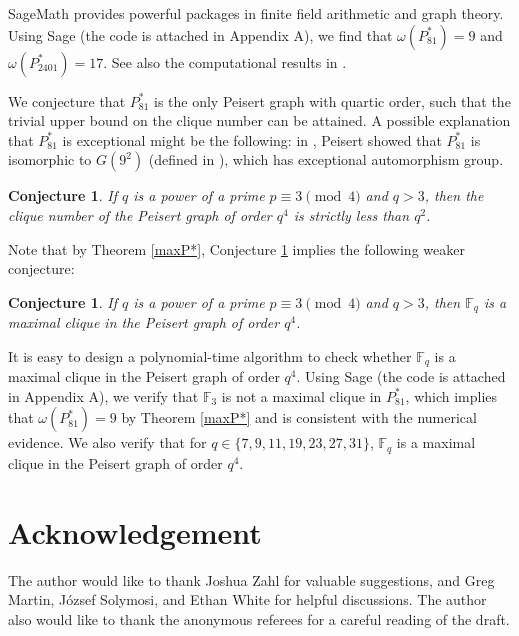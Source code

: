 \documentclass[12pt,oneside]{amsart}
\newtheorem{conj}[thm]{Conjecture}
\newcommand{\F}{\mathbb{F}}
\begin{document}
SageMath \cite{Sage} provides powerful packages in finite field arithmetic and graph theory. Using Sage (the code is attached in Appendix A), we find that $\omega(P_{81}^*)=9$ and $\omega(P_{2401}^*)=17$. See also the computational results in \cite[Section 3.4]{NM}. 

We conjecture that $P_{81}^*$ is the only Peisert graph with quartic order, such that the trivial upper bound on the clique number can be attained. A possible explanation that $P_{81}^*$ is exceptional might be the following: in \cite[Lemma 6.7]{WP2}, Peisert showed that $P_{81}^*$ is isomorphic to $G(9^2)$ (defined in \cite[Section 3]{WP2}), which has exceptional automorphism group.

\begin{conj}\label{conjclique}
If $q$ is a power of a prime $p \equiv 3 \pmod 4$  and $q>3$, then the clique number of the Peisert graph of order $q^4$ is strictly less than $q^2$.
\end{conj}

Note that by Theorem \ref{maxP*}, Conjecture \ref{conjclique} implies the following weaker conjecture:


\begin{conj}\label{conjmaxc}
If $q$ is a power of a prime $p \equiv 3 \pmod 4$  and $q>3$, then $\F_{q}$ is a maximal clique in the Peisert graph of order $q^4$.
\end{conj}

It is easy to design a polynomial-time algorithm to check whether $\F_{q}$ is a maximal clique in the Peisert graph of order $q^4$.  Using Sage \cite{Sage} (the code is attached in Appendix A), we verify that $\F_3$ is not a maximal clique in $P_{81}^*$, which implies that $\omega(P_{81}^*)=9$ by Theorem \ref{maxP*} and is consistent with the numerical evidence. We also verify that for $q \in \{7,9,11,19,23,27,31\}$, $\F_{q}$ is a maximal clique in the Peisert graph of order $q^4$. 

\section*{Acknowledgement}
The author would like to thank Joshua Zahl for valuable suggestions, and  Greg Martin, J\'ozsef Solymosi, and Ethan White for helpful discussions. The author also would like to thank the anonymous referees for a careful reading of the draft. 
\end{document}
